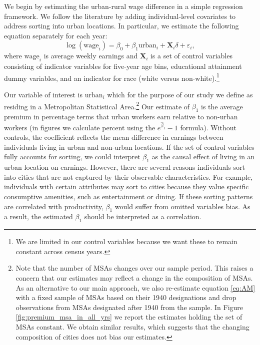 \documentclass[12pt]{article}
\begin{document}
We begin by estimating the urban-rural wage difference in a simple regression framework.
We follow the literature by adding individual-level covariates to address sorting into urban locations.
In particular, we estimate the following equation separately for each year:
\begin{equation}\label{eq:controls}
    \log(\text{wage}_i) = \beta_0 + \beta_1 \text{urban}_i + \bm{X}_{i} \delta + \varepsilon_i,
\end{equation}
where $\text{wage}_i$ is average weekly earnings and $\bm{X}_i$ is a set of control variables consisting of indicator variables for five-year age bins, educational attainment dummy variables, and an indicator for race (white versus non-white).\footnote{
We are limited in our control variables because we want these to remain constant across census years.}

Our variable of interest is $\text{urban}_i$ which for the purpose of our study we define as residing in a Metropolitan Statistical Area.\footnote{
Note that the number of MSAs changes over our sample period.
This raises a concern that our estimates may reflect a change in the composition of MSAs.
As an alternative to our main approach, we also re-estimate equation \eqref{eq:AM} with a fixed sample of MSAs based on their 1940 designations and drop observations from MSAs designated after 1940 from the sample.
In Figure \ref{fig:premium_msa_in_all_yrs} we report the estimates holding the set of MSAs constant.
We obtain similar results, which suggests that the changing composition of cities does not bias our estimates.    
}
Our estimate of $\beta_1$ is the average premium in percentage terms that urban workers earn relative to non-urban workers (in figures we calculate percent using the $e^{\hat{\beta}_1} - 1$ formula).
Without controls, the coefficient reflects the mean difference in earnings between individuals living in urban and non-urban locations.
If the set of control variables fully accounts for sorting, we could interpret $\beta_1$ as the causal effect of living in an urban location on earnings.
However, there are several reasons individuals sort into cities that are not captured by their observable characteristics.
For example, individuals with certain attributes may sort to cities because they value specific consumptive amenities, such as entertainment or dining.
If these sorting patterns are correlated with productivity, $\beta_1$ would suffer from omitted variables bias.
As a result, the estimated $\beta_1$ should be interpreted as a correlation.
\end{document}
